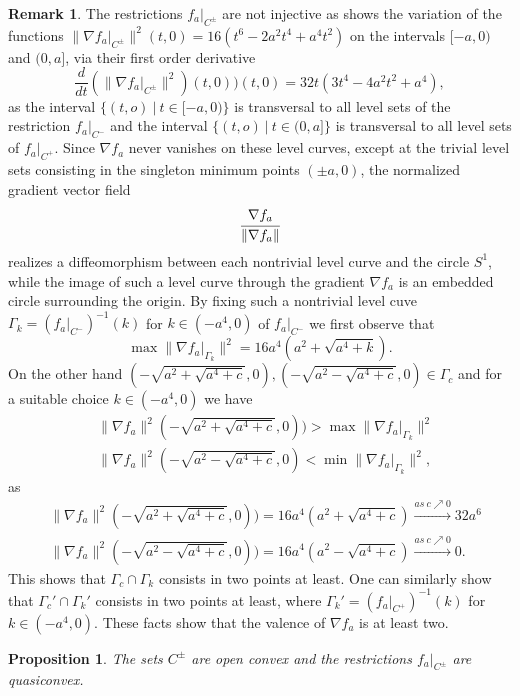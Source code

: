 \documentclass[12pt,twoside,reqno]{amsart}
\newtheorem{proposition}{Proposition}[section]
\theoremstyle{definition}
\newtheorem{remark}{Remark}[section]
\numberwithin{equation}{section}
\begin{document}
\begin{remark}
The restrictions $f_a\big|_{C^{\pm}}$ are not injective as shows the variation of the functions $\|\nabla f_a\big|_{C^{\pm}}\|^2(t,0)=16(t^6-2a^2t^4+a^4 t^2)$
on the intervals $[-a,0)$ and $(0,a]$, via their first order derivative \[\frac{d}{dt}(\|\nabla f_a\big|_{C^{\pm}}\|^2)(t,0))(t,0)=32t(3t^4-4a^2t^2+a^4),\]
as the interval $\{(t,o) \ | \ t\in[-a,0)\}$ is transversal to all level sets of the restriction $f_a\big|_{C^{-}}$ and the interval $\{(t,o) \ | \ t\in(0,a]\}$ 
is transversal to all level sets of $f_a\big|_{C^{+}}$. Since $\nabla f_a$ never vanishes on these level curves, except at the trivial level sets consisting in the 
singleton minimum points $(\pm a,0)$, the normalized gradient vector field \[\cfrac{\nabla f_a}{\|\nabla f_a\|}\]
realizes a diffeomorphism between each nontrivial level curve and the circle $S^1$, while the image of such a level curve through the gradient $\nabla f_a$ 
is an embedded circle surrounding the origin. By fixing such a nontrivial level cuve $\Gamma_k=(f_a\big|_{C^{-}})^{-1}(k)$ for $k\in(-a^4,0)$ of  $f_a\big|_{C^{-}}$ 
we first observe that \[\max\|\nabla f_a\big|_{\Gamma_k}\|^2=16a^4(a^2+\sqrt{a^4+k}).\]
On the other hand $(-\sqrt{a^2+\sqrt{a^4+c}},0),(-\sqrt{a^2-\sqrt{a^4+c}},0)\in\Gamma_c$ and for a suitable choice $k\in(-a^4,0)$ we have 
\begin{align}
& \|\nabla f_a\|^2(-\sqrt{a^2+\sqrt{a^4+c}},0))>\max\|\nabla f_a\big|_{\Gamma_k}\|^2\nonumber\\
& \|\nabla f_a\|^2(-\sqrt{a^2-\sqrt{a^4+c}},0)<\min\|\nabla f_a\big|_{\Gamma_k}\|^2,\nonumber
\end{align}
as
\begin{align}
& \|\nabla f_a\|^2(-\sqrt{a^2+\sqrt{a^4+c}},0))=16a^4(a^2+\sqrt{a^4+c})\stackrel{as \ c\nearrow 0}{\longrightarrow}32a^6\nonumber\\
& \|\nabla f_a\|^2(-\sqrt{a^2-\sqrt{a^4+c}},0))=16a^4(a^2-\sqrt{a^4+c})\stackrel{as \ c\nearrow 0}{\longrightarrow}0.\nonumber
\end{align}
This shows that $\Gamma_c\cap \Gamma_k$ consists in two points at least. One can similarly show that $\Gamma_c'\cap \Gamma_k'$ consists in two points at least, where 
$\Gamma_k'=(f_a\big|_{C^{+}})^{-1}(k)$ for $k\in(-a^4,0)$. These facts show that the valence of $\nabla f_a$ is at least two.
\end{remark}
\begin{proposition}
The sets $C^{\pm}$ are open convex and the restrictions $f_a\big|_{C^{\pm}}$ are quasiconvex.
\end{proposition}
\end{document}
